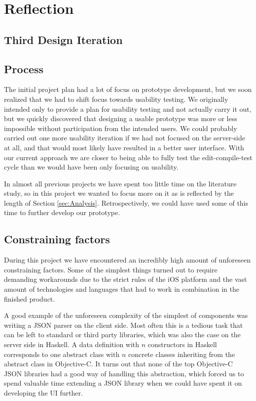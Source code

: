 \section{Reflection}
\label{sec:Reflection}

\subsection{Third Design Iteration}

\subsection{Process}
The initial project plan had a lot of focus on prototype development, but we
soon realized that we had to shift focus towards usability testing. We
originally intended only to provide a plan for usability testing and not
actually carry it out, but we quickly discovered that designing a usable prototype was more or less impossible without
participation from the intended users. We could probably carried out one more
usability iteration if we had not focused on the server-side at all, and that
would most likely have resulted in a better user interface. With our
current approach we are closer to being able to fully test the
edit-compile-test cycle than we would have been only focusing on usability.

In almost all previous projects we have spent too little time on the literature
study, so in this project we wanted to focus more on it as is reflected by the
length of Section \ref{sec:Analysis}. Retrospectively, we could have used some of this time to further develop our prototype. 

\subsection{Constraining factors}
During this project we have encountered an incredibly high amount of unforeseen constraining factors. Some of the simplest things turned out to require demanding workarounds due to the strict rules of the iOS platform and the vast amount of technologies and languages that had to work in combination in the finished product.

A good example of the unforeseen complexity of the simplest of components was writing a JSON parser on the client side. Most often this is a tedious task that can be left to standard or third party libraries, which was also the case on the server side in Haskell. A data definition with $n$ constructors in Haskell corresponds to one abstract class with $n$ concrete classes inheriting from the abstract class in Objective-C. It turns out that none of the top Objective-C JSON libraries had a good way of handling this abstraction, which forced us to spend valuable time extending a JSON library when we could have spent it on developing the UI further.


